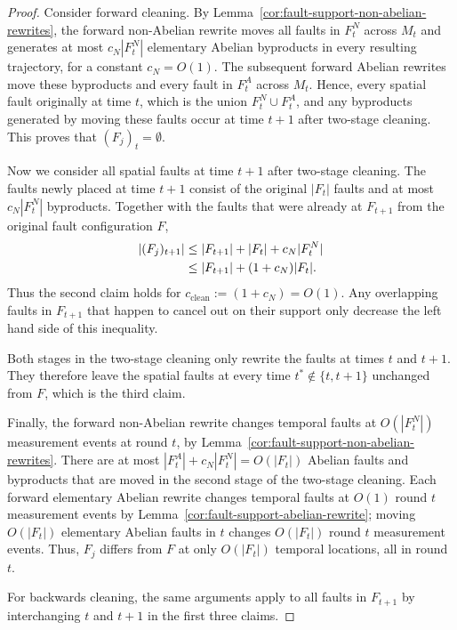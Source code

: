 \documentclass[11pt]{article}
\begin{document}
\begin{proof}
    Consider forward cleaning.
    By Lemma~\ref{cor:fault-support-non-abelian-rewrites}, the forward non-Abelian rewrite moves all faults in $F_t^N$ across $M_t$ and generates at most $c_N|F_t^N|$ elementary Abelian byproducts in every resulting trajectory, for a constant $c_N=O(1)$.
    The subsequent forward Abelian rewrites move these byproducts and every fault in $F_t^A$ across $M_t$. Hence, every spatial fault originally at time $t$, which is the union $F_t^N\cup F_t^A$, and any byproducts generated by moving these faults occur at time $t+1$ after two-stage cleaning. This proves that $(F_j)_t=\emptyset$.
    
    Now we consider all spatial faults at time $t+1$ after two-stage cleaning.
    The faults newly placed at time $t+1$ consist of the original $|F_t|$ faults and at most $c_N|F_t^N|$ byproducts. Together with the faults that were already at $F_{t+1}$ from the original fault configuration $F$,
    \begin{align}
        |(F_j)_{t+1}| &\le |F_{t+1}| + |F_t| + c_N|F_t^N|\notag\\
        &\le |F_{t+1}| + (1 + c_N)|F_t| .
    \end{align}
    Thus the second claim holds for $c_{\mathrm{clean}}:=(1+c_N)=O(1)$. Any overlapping faults in $F_{t+1}$ that happen to cancel out on their support only decrease the left hand side of this inequality.

    Both stages in the two-stage cleaning only rewrite the faults at times $t$ and $t+1$. They therefore leave the spatial faults at every time $t^*\notin \{t,t+1\}$ unchanged from $F$, which is the third claim.

    Finally, the forward non-Abelian rewrite changes temporal faults at $O(|F_t^N|)$ measurement events at round $t$, by Lemma~\ref{cor:fault-support-non-abelian-rewrites}.
    There are at most $|F_t^A|+c_N|F_t^N| = O(|F_t|)$ Abelian faults and byproducts that are moved in the second stage of the two-stage cleaning. Each forward elementary Abelian rewrite changes temporal faults at $O(1)$ round $t$ measurement events by Lemma~\ref{cor:fault-support-abelian-rewrite}; moving $O(|F_t|)$ elementary Abelian faults in $t$ changes $ O(|F_t|)$ round $t$ measurement events.
    Thus, $F_j$ differs from $F$ at only $O(|F_t|)$ temporal locations, all in round $t$.

    For backwards cleaning, the same arguments apply to all faults in $F_{t+1}$ by interchanging $t$ and $t+1$ in the first three claims. 
\end{proof}
\end{document}

